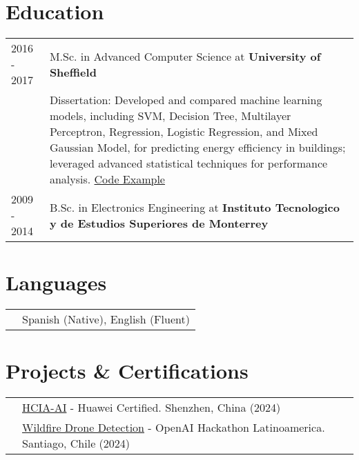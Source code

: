 \documentclass[a4paper,12pt]{article}
\begin{document}
\section{Education}
\begin{tabularx}{\linewidth}{@{}l X@{}}	
    2016 - 2017 & M.Sc. in Advanced Computer Science at \textbf{University of Sheffield} \\
    & Dissertation: Developed and compared machine learning models, including SVM, Decision Tree, Multilayer Perceptron, Regression, Logistic Regression, and Mixed Gaussian Model, for predicting energy efficiency in buildings; leveraged advanced statistical techniques for performance analysis. \href{https://github.com/dcerdac/DissertationCode}{Code Example} \\
    2009 - 2014 & B.Sc. in Electronics Engineering at \textbf{Instituto Tecnologico y de Estudios Superiores de Monterrey} \\
\end{tabularx}

\section{Languages}
\begin{tabularx}{\linewidth}{@{}l X@{}}
& \normalsize{Spanish (Native), English (Fluent)}\\
\end{tabularx}

\section{Projects \& Certifications}

\begin{tabularx}{\linewidth}{@{}l X@{}}
& \normalsize{\href{https://github.com/dcerdac/MachineLearningProjects/blob/master/010102001521809623012377209.pdf}{HCIA-AI} - Huawei Certified. Shenzhen, China (2024)}\\
& \normalsize{\href{https://github.com/dcerdac/keepnai}{Wildfire Drone Detection} - OpenAI Hackathon Latinoamerica. Santiago, Chile (2024)}\\

\end{tabularx}
\end{document}
